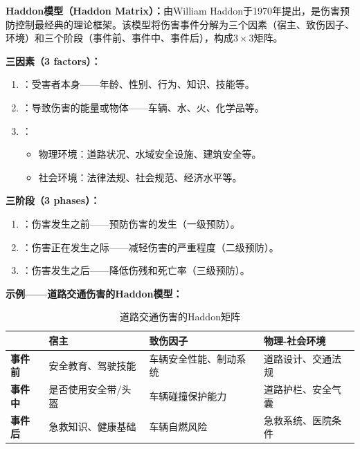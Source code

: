 \begin{keybox}
\textbf{Haddon模型（Haddon Matrix）：}由William Haddon于1970年提出，是伤害预防控制最经典的理论框架。该模型将伤害事件分解为三个因素（宿主、致伤因子、环境）和三个阶段（事件前、事件中、事件后），构成$3\times3$矩阵。

\textbf{三因素（3 factors）：}
\begin{enumerate}[leftmargin=*]
    \item {}：受害者本身——年龄、性别、行为、知识、技能等。
    \item {}：导致伤害的能量或物体——车辆、水、火、化学品等。
    \item {}：
    \begin{itemize}
        \item 物理环境：道路状况、水域安全设施、建筑安全等。
        \item 社会环境：法律法规、社会规范、经济水平等。
    \end{itemize}
\end{enumerate}

\textbf{三阶段（3 phases）：}
\begin{enumerate}[leftmargin=*]
    \item {}：伤害发生之前——预防伤害的发生（一级预防）。
    \item {}：伤害正在发生之际——减轻伤害的严重程度（二级预防）。
    \item {}：伤害发生之后——降低伤残和死亡率（三级预防）。
\end{enumerate}

\textbf{示例——道路交通伤害的Haddon模型：}
\begin{table}[H]
\centering
\caption{道路交通伤害的Haddon矩阵}
\begin{tabularx}{\textwidth}{l>{\raggedright\arraybackslash}p{3.5cm}>{\raggedright\arraybackslash}p{3.5cm}>{\raggedright\arraybackslash}p{3.5cm}}
\hline
& \textbf{宿主} & \textbf{致伤因子} & \textbf{物理-社会环境} \\
\hline
\textbf{事件前} & 安全教育、驾驶技能 & 车辆安全性能、制动系统 & 道路设计、交通法规 \\
\hline
\textbf{事件中} & 是否使用安全带/头盔 & 车辆碰撞保护能力 & 道路护栏、安全气囊 \\
\hline
\textbf{事件后} & 急救知识、健康基础 & 车辆自燃风险 & 急救系统、医院条件 \\
\hline
\end{tabularx}
\end{table}
\end{keybox}

